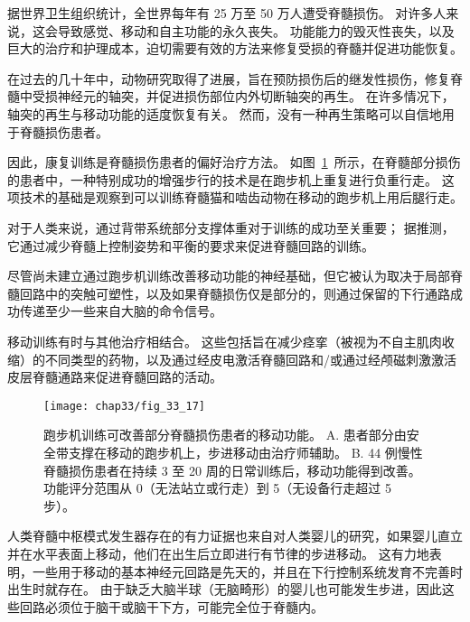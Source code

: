\begin{proposition}[康复训练可改善人类脊髓损伤后的行走] \label{box:33_4}
	
	\quad \quad 据世界卫生组织统计，全世界每年有 25 万至 50 万人遭受脊髓损伤。
	对许多人来说，这会导致感觉、移动和自主功能的永久丧失。
	功能能力的毁灭性丧失，以及巨大的治疗和护理成本，迫切需要有效的方法来修复受损的脊髓并促进功能恢复。
	
	\quad \quad 在过去的几十年中，动物研究取得了进展，旨在预防损伤后的继发性损伤，修复脊髓中受损神经元的轴突，并促进损伤部位内外切断轴突的再生。
	在许多情况下，轴突的再生与移动功能的适度恢复有关。
	然而，没有一种再生策略可以自信地用于脊髓损伤患者。
	
	\quad \quad 因此，康复训练是脊髓损伤患者的偏好治疗方法。
	如图~\ref{fig:33_17}~所示，在脊髓部分损伤的患者中，一种特别成功的增强步行的技术是在跑步机上重复进行负重行走。
	这项技术的基础是观察到可以训练脊髓猫和啮齿动物在移动的跑步机上用后腿行走。
	
	\quad \quad 对于人类来说，通过背带系统部分支撑体重对于训练的成功至关重要；
	据推测，它通过减少脊髓上控制姿势和平衡的要求来促进脊髓回路的训练。
	
	\quad \quad 尽管尚未建立通过跑步机训练改善移动功能的神经基础，但它被认为取决于局部脊髓回路中的突触可塑性，以及如果脊髓损伤仅是部分的，则通过保留的下行通路成功传递至少一些来自大脑的命令信号。
	
	\quad \quad 移动训练有时与其他治疗相结合。
	这些包括旨在减少痉挛（被视为不自主肌肉收缩）的不同类型的药物，以及通过经皮电激活脊髓回路和/或通过经颅磁刺激激活皮层脊髓通路来促进脊髓回路的活动。
	
\end{proposition}


\begin{figure}[htbp]
	\centering
	\texttt{[image: chap33/fig\_33\_17]}
	\caption{跑步机训练可改善部分脊髓损伤患者的移动功能。
		A. 患者部分由安全带支撑在移动的跑步机上，步进移动由治疗师辅助。
		B. 44 例慢性脊髓损伤患者在持续 3 至 20 周的日常训练后，移动功能得到改善。
		功能评分范围从 0（无法站立或行走）到 5（无设备行走超过 5 步）\cite{wernig1995laufband}。}
	\label{fig:33_17}
\end{figure}


人类脊髓中枢模式发生器存在的有力证据也来自对人类婴儿的研究，如果婴儿直立并在水平表面上移动，他们在出生后立即进行有节律的步进移动。
这有力地表明，一些用于移动的基本神经元回路是先天的，并且在下行控制系统发育不完善时出生时就存在。
由于缺乏大脑半球（无脑畸形）的婴儿也可能发生步进，因此这些回路必须位于脑干或脑干下方，可能完全位于脊髓内。


